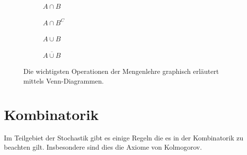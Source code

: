 \begin{figure}[h!]
	\rule[1mm]{0mm}{5mm}

	\begin{subfigure}[b]{0.45\textwidth}
		\centering
		\begin{venndiagram2sets}[tikzoptions={scale=0.7}]
    			\fillACapB
		\end{venndiagram2sets}
		\caption{$A \cap B$}
	\end{subfigure}
	\begin{subfigure}[b]{0.45\textwidth}
		\centering
		\begin{venndiagram2sets}[tikzoptions={scale=0.7}]
			\fillNotAorNotB
		\end{venndiagram2sets}
		\caption{${A\cap B}^C$}
	\end{subfigure}

	\rule[1mm]{0mm}{5mm}

	\begin{subfigure}[b]{0.45\textwidth}
		\centering
		\begin{venndiagram2sets}[tikzoptions={scale=0.7}]
			\fillA \fillB
		\end{venndiagram2sets}
		\caption{$A \cup B$}
	\end{subfigure}	
	\begin{subfigure}[b]{0.45\textwidth}
		\centering
		\begin{venndiagram2sets}[tikzoptions={scale=0.7}]
			\fillNotAorB
		\end{venndiagram2sets}
		\caption{$\overline{A \cup B}$}
	\end{subfigure}
	\caption{Die wichtigsten Operationen der Mengenlehre graphisch
	erläutert mittels Venn-Diagrammen.}
\end{figure}

\section{Kombinatorik}
Im Teilgebiet der Stochastik gibt es einige Regeln die es in der 
Kombinatorik zu beachten gilt. Insbesondere sind dies die 
\gls{Axiome von Kolmogorov}.

